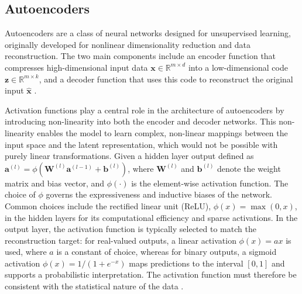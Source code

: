 \subsection{Autoencoders} \label{s:background_ae}

Autoencoders are a class of neural networks designed for unsupervised learning, originally developed for nonlinear dimensionality reduction and data reconstruction. The two main components include an encoder function that compresses high-dimensional input data $\mathbf{x} \in \mathbb{R}^{m \times d}$ into a low-dimensional code $\mathbf{z} \in \mathbb{R}^{m \times k}$, and a decoder function that uses this code to reconstruct the original input $\hat{\mathbf{x}}$ \citep{hinton2006reducing, sakurada2014anomaly}.

Activation functions play a central role in the architecture of autoencoders by introducing non-linearity into both the encoder and decoder networks. This non-linearity enables the model to learn complex, non-linear mappings between the input space and the latent representation, which would not be possible with purely linear transformations. Given a hidden layer output defined as $\mathbf{a}^{(l)} = \phi(\mathbf{W}^{(l)} \mathbf{a}^{(l-1)} + \mathbf{b}^{(l)})$, where $\mathbf{W}^{(l)}$ and $\mathbf{b}^{(l)}$ denote the weight matrix and bias vector, and $\phi(\cdot)$ is the element-wise activation function. The choice of $\phi$ governs the expressiveness and inductive biases of the network. Common choices include the rectified linear unit (ReLU), $\phi(x) = \max(0, x)$, in the hidden layers for its computational efficiency and sparse activations. In the output layer, the activation function is typically selected to match the reconstruction target: for real-valued outputs, a linear activation $\phi(x) = ax$ is used, where $a$ is a constant of choice, whereas for binary outputs, a sigmoid activation $\phi(x) = 1 / (1 + e^{-x})$ maps predictions to the interval $[0, 1]$ and supports a probabilistic interpretation. The activation function must therefore be consistent with the statistical nature of the data \citep{sharma2017activation}.

